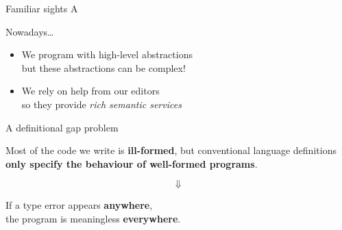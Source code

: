 
\begin{frame}[fragile]{Familiar sights}
  A
\end{frame}

\begin{frame}{Nowadays\ldots}
  \begin{itemize}
    \item We program with high-level abstractions \\ \pause
      but these abstractions can be complex!

      \pause
    \item We rely on help from our editors \\ \pause
      so they provide \emph{rich semantic services}
  \end{itemize}
\end{frame}

\begin{frame}{A definitional gap problem}
  \begin{center}
    Most of the code we write is \textbf{ill-formed}\pause,
    but conventional language definitions \textbf{only specify the behaviour of well-formed programs}.
  \end{center}
  \pause
  \[%
    \Downarrow
  \]%

  \begin{center}
    If a type error appears \textbf{anywhere},\\
    the program is meaningless \textbf{everywhere}.
  \end{center}
\end{frame}


